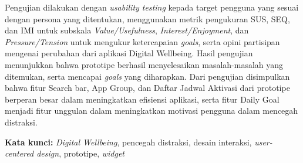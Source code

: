 \begin{singlespace}
  Pengujian dilakukan dengan \textit{usability testing} kepada target pengguna yang sesuai dengan persona yang ditentukan, menggunakan metrik pengukuran SUS, SEQ, dan IMI untuk subskala \textit{Value/Usefulness}, \textit{Interest/Enjoyment}, dan \textit{Pressure/Tension} untuk mengukur ketercapaian \textit{goals}, serta opini partisipan mengenai perubahan dari aplikasi Digital Wellbeing.
  Hasil pengujian menunjukkan bahwa prototipe berhasil menyelesaikan masalah-masalah yang ditemukan, serta mencapai \textit{goals} yang diharapkan.
  Dari pengujian disimpulkan bahwa fitur Search bar, App Group, dan Daftar Jadwal Aktivasi dari prototipe berperan besar dalam meningkatkan efisiensi aplikasi, serta fitur Daily Goal menjadi fitur unggulan dalam meningkatkan motivasi pengguna dalam mencegah distraksi.

\noindent \textbf{Kata kunci:} \textit{Digital Wellbeing}, pencegah distraksi, desain interaksi, \textit{user-centered design}, prototipe, \textit{widget}
\end{singlespace}